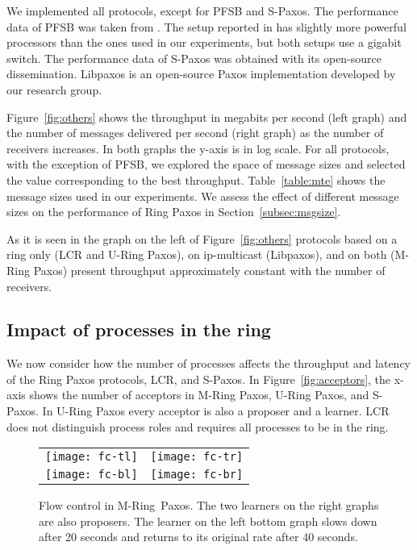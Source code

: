 \documentclass[final,3p,times,twocolumn,authoryear]{elsarticle}
\begin{document}
We implemented all protocols, except for PFSB and S-Paxos. 
The performance data of PFSB was taken from \cite{KA08}. The setup reported in \cite{KA08} has slightly more powerful processors than the ones used in our experiments, but both setups use a gigabit switch. The performance data of S-Paxos was obtained with its open-source dissemination. Libpaxos is an open-source Paxos implementation developed by our research group.


Figure~\ref{fig:others} shows the throughput in megabits per second (left graph) and the number of messages delivered per second (right graph) as the number of receivers increases. In both graphs the y-axis is in log scale. 
For all protocols, with the exception of PFSB, we explored the space of message sizes and selected the value corresponding to the best throughput. Table~\ref{table:mte} shows the message sizes used in our experiments. We assess the effect of different message sizes on the performance of Ring Paxos in Section~\ref{subsec:msgsize}.



As it is seen in the graph on the left of Figure~\ref{fig:others} protocols based on a ring only (LCR and U-Ring Paxos), on ip-multicast (Libpaxos), and on both (M-Ring Paxos) present throughput approximately constant with the number of receivers. 



\subsection{Impact of processes in the ring}
\label{sec:procring}

We now consider how the number of processes affects the throughput and latency of the Ring Paxos protocols, LCR, and S-Paxos. 
In Figure~\ref{fig:acceptors}, the x-axis shows the number of acceptors in M-Ring Paxos, U-Ring Paxos, and S-Paxos. In U-Ring Paxos every acceptor is also a proposer and a learner. 
LCR does not distinguish process roles and requires all processes to be in the ring. 

\begin{figure*}
          \vspace{-15mm}
  \begin{center}
  
    \begin{tabular}{cc}
      \texttt{[image: fc-tl]} &
       \texttt{[image: fc-tr]} \\
      \texttt{[image: fc-bl]} &
      \texttt{[image: fc-br]} \\

    \end{tabular}
\caption{Flow control in M-Ring~Paxos. The two learners on the right graphs are also proposers. The learner on the left bottom graph slows down after 20 seconds and returns to its original rate after 40 seconds. }
    \label{fig:fcontrol}
        \vspace{-5mm}
  \end{center}
\end{figure*}
\end{document}
